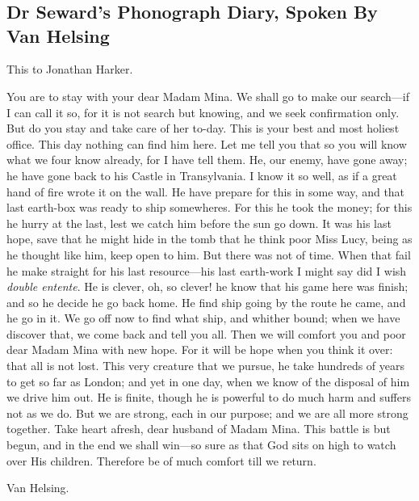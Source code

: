 \chapter[Chapter \thechapter]{}


\section{Dr Seward's Phonograph Diary, Spoken By Van Helsing}

This to Jonathan Harker.

You are to stay with your dear Madam Mina. We shall go to make our search—if I can call it so, for it is not search but knowing, and we seek confirmation only. But do you stay and take care of her to-day. This is your best and most holiest office. This day nothing can find him here. Let me tell you that so you will know what we four know already, for I have tell them. He, our enemy, have gone away; he have gone back to his Castle in Transylvania. I know it so well, as if a great hand of fire wrote it on the wall. He have prepare for this in some way, and that last earth-box was ready to ship somewheres. For this he took the money; for this he hurry at the last, lest we catch him before the sun go down. It was his last hope, save that he might hide in the tomb that he think poor Miss Lucy, being as he thought like him, keep open to him. But there was not of time. When that fail he make straight for his last resource—his last earth-work I might say did I wish \textit{double entente}. He is clever, oh, so clever! he know that his game here was finish; and so he decide he go back home. He find ship going by the route he came, and he go in it. We go off now to find what ship, and whither bound; when we have discover that, we come back and tell you all. Then we will comfort you and poor dear Madam Mina with new hope. For it will be hope when you think it over: that all is not lost. This very creature that we pursue, he take hundreds of years to get so far as London; and yet in one day, when we know of the disposal of him we drive him out. He is finite, though he is powerful to do much harm and suffers not as we do. But we are strong, each in our purpose; and we are all more strong together. Take heart afresh, dear husband of Madam Mina. This battle is but begun, and in the end we shall win—so sure as that God sits on high to watch over His children. Therefore be of much comfort till we return.

\begin{flushright}Van Helsing.\end{flushright}

